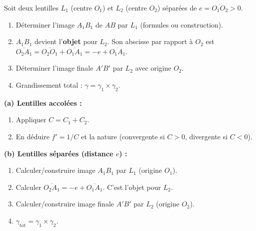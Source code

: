 \documentclass[11pt]{article}
\begin{document}
\begin{propriete}
Soit deux lentilles $L_1$ (centre $O_1$) et $L_2$ (centre $O_2$) séparées de $e = \overline{O_1O_2} > 0$.
\begin{enumerate}
\item Déterminer l'image $A_1B_1$ de $AB$ par $L_1$ (formules ou construction).
\item $A_1B_1$ devient l'\textbf{objet} pour $L_2$. Son abscisse par rapport à $O_2$ est $\overline{O_2A_1} = \overline{O_2O_1} + \overline{O_1A_1} = -e + \overline{O_1A_1}$.
\item Déterminer l'image finale $A'B'$ par $L_2$ avec origine $O_2$.
\item Grandissement total : $\gamma = \gamma_1 \times \gamma_2$.
\end{enumerate}
\end{propriete}

\begin{methode}
\textbf{(a) Lentilles accolées :}
\begin{enumerate}
\item Appliquer $C = C_1 + C_2$.
\item En déduire $f' = 1/C$ et la nature (convergente si $C>0$, divergente si $C<0$).
\end{enumerate}
\textbf{(b) Lentilles séparées (distance $e$) :}
\begin{enumerate}
\item Calculer/construire image $A_1B_1$ par $L_1$ (origine $O_1$).
\item Calculer $\overline{O_2A_1} = -e + \overline{O_1A_1}$. C'est l'objet pour $L_2$.
\item Calculer/construire image finale $A'B'$ par $L_2$ (origine $O_2$).
\item $\gamma_{\text{tot}} = \gamma_1 \times \gamma_2$.
\end{enumerate}
\end{methode}
\end{document}

